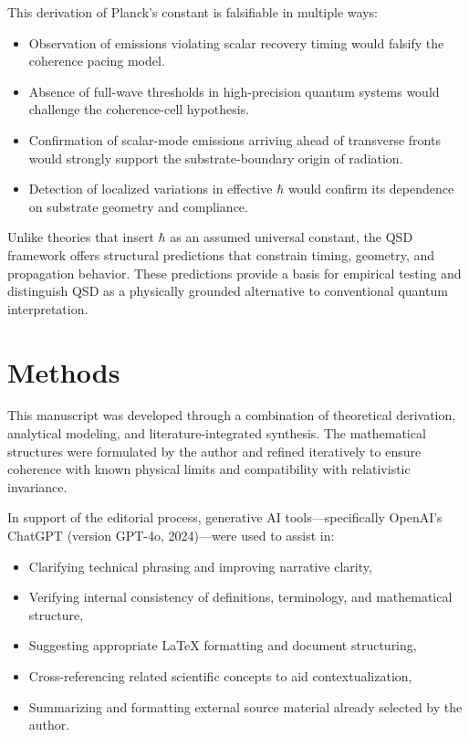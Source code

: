 \documentclass[ht-mathphys]{ht-fmt}
\theoremstyle{thmstyleone}%
\theoremstyle{thmstyletwo}%
\theoremstyle{thmstylethree}%
\begin{document}
This derivation of Planck’s constant is falsifiable in multiple ways:

\begin{itemize}
    \item Observation of emissions violating scalar recovery timing would falsify the coherence pacing model.
    \item Absence of full-wave thresholds in high-precision quantum systems would challenge the coherence-cell hypothesis.
    \item Confirmation of scalar-mode emissions arriving ahead of transverse fronts would strongly support the substrate-boundary origin of radiation.
    \item Detection of localized variations in effective $\hbar$ would confirm its dependence on substrate geometry and compliance.
\end{itemize}

Unlike theories that insert $\hbar$ as an assumed universal constant, the QSD framework offers structural predictions that constrain timing, geometry, and propagation behavior. These predictions provide a basis for empirical testing and distinguish QSD as a physically grounded alternative to conventional quantum interpretation.

\section*{Methods}
This manuscript was developed through a combination of theoretical derivation, analytical modeling, and literature-integrated synthesis. The mathematical structures were formulated by the author and refined iteratively to ensure coherence with known physical limits and compatibility with relativistic invariance.

In support of the editorial process, generative AI tools—specifically OpenAI's ChatGPT (version GPT-4o, 2024)—were used to assist in:
\begin{itemize}
    \item Clarifying technical phrasing and improving narrative clarity,
    \item Verifying internal consistency of definitions, terminology, and mathematical structure,
    \item Suggesting appropriate LaTeX formatting and document structuring,
    \item Cross-referencing related scientific concepts to aid contextualization,
    \item Summarizing and formatting external source material already selected by the author.
\end{itemize}
\end{document}
